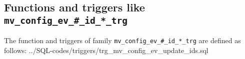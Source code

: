 
\subsection{Functions and triggers like \texttt{mv\_config\_ev\_\#\_id\_*\_trg}}\label{subsec_appx_trg_mv_config_ev_update_ids}

The function and triggers of family \texttt{mv\_config\_ev\_\#\_id\_*\_trg} are defined as follows:
%
{../SQL-codes/triggers/trg_mv_config_ev_update_ids.sql}
